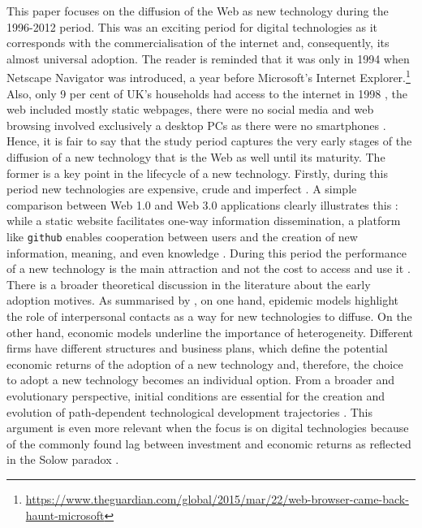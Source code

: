 \documentclass[
  authoryear,
  preprint,
  3p]{elsarticle}
\begin{document}
This paper focuses on the diffusion of the Web as new technology during
the 1996-2012 period. This was an exciting period for digital
technologies as it corresponds with the commercialisation of the
internet and, consequently, its almost universal adoption. The reader is
reminded that it was only in 1994 when Netscape Navigator was
introduced, a year before Microsoft's Internet Explorer.\footnote{\url{https://www.theguardian.com/global/2015/mar/22/web-browser-came-back-haunt-microsoft}}
Also, only 9 per cent of UK's households had access to the internet in
1998 \citep{ons2018}, the web included mostly static webpages, there
were no social media and web browsing involved exclusively a desktop PCs
as there were no smartphones \citep{tranosuk}. Hence, it is fair to say
that the study period captures the very early stages of the diffusion of
a new technology that is the Web as well until its maturity. The former
is a key point in the lifecycle of a new technology. Firstly, during
this period new technologies are expensive, crude and imperfect
\citep{rosenberg1994exploring, wilson201281}. A simple comparison
between Web 1.0 and Web 3.0 applications clearly illustrates this
\citep{tranos2020social}: while a static website facilitates one-way
information dissemination, a platform like \texttt{github} enables
cooperation between users and the creation of new information, meaning,
and even knowledge \citep{faraj2016special, barassi2012does}. During
this period the performance of a new technology is the main attraction
and not the cost to access and use it \citep{wilson2011lessons}. There
is a broader theoretical discussion in the literature about the early
adoption motives. As summarised by \citet{perkins2005international}, on
one hand, epidemic models highlight the role of interpersonal contacts
as a way for new technologies to diffuse. On the other hand, economic
models underline the importance of heterogeneity. Different firms have
different structures and business plans, which define the potential
economic returns of the adoption of a new technology and, therefore, the
choice to adopt a new technology becomes an individual option. From a
broader and evolutionary perspective, initial conditions are essential
for the creation and evolution of path-dependent technological
development trajectories \citep{neffke2011regions, simmie2014new}. This
argument is even more relevant when the focus is on digital technologies
because of the commonly found lag between investment and economic
returns as reflected in the Solow paradox
\citep{acemoglu2014return, brynjolfsson2018artificial}.
\end{document}
